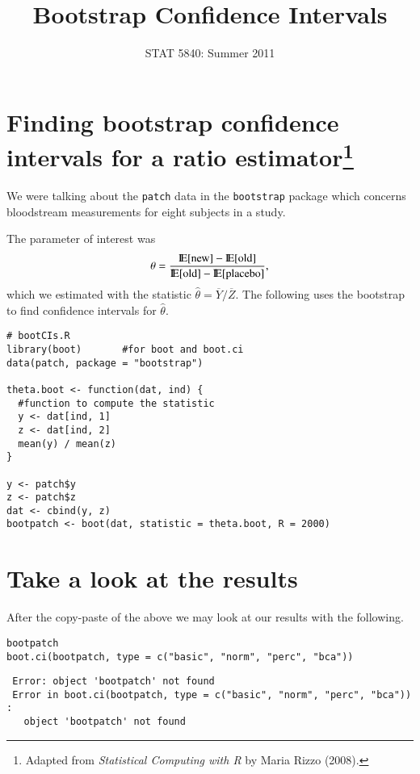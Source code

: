 \documentclass[11pt,english]{article}
\title{Bootstrap Confidence Intervals}
\date{STAT 5840: Summer 2011}
\begin{document}
\maketitle

\thispagestyle{empty}

\section*{Finding bootstrap confidence intervals for a ratio estimator\footnote{Adapted from \emph{Statistical Computing with R} by Maria Rizzo (2008). }}
\label{sec-1}

We were talking about the \texttt{patch} data in the \texttt{bootstrap} package which concerns bloodstream measurements for eight subjects in a study. 



The parameter of interest was
\[
\theta = \frac{\mathrm{I\hspace{-1.5pt}E}[\mathrm{new}] - \mathrm{I\hspace{-1.5pt}E}[\mathrm{old}]}{\mathrm{I\hspace{-1.5pt}E}[\mathrm{old}] - \mathrm{I\hspace{-1.5pt}E}[\mathrm{placebo}]},
\]
which we estimated with the statistic \(\hat{\theta} = \overline{Y}/\overline{Z}\).  The following uses the bootstrap to find confidence intervals for $\hat{\theta}$.


\begin{verbatim}
# bootCIs.R
library(boot)       #for boot and boot.ci
data(patch, package = "bootstrap")

theta.boot <- function(dat, ind) {
  #function to compute the statistic
  y <- dat[ind, 1]
  z <- dat[ind, 2]
  mean(y) / mean(z)
}

y <- patch$y
z <- patch$z
dat <- cbind(y, z)
bootpatch <- boot(dat, statistic = theta.boot, R = 2000)
\end{verbatim}
\section*{Take a look at the results}
\label{sec-2}

After the copy-paste of the above we may look at our results with the following.

\begin{verbatim}
bootpatch
boot.ci(bootpatch, type = c("basic", "norm", "perc", "bca"))
\end{verbatim}




\begin{verbatim}
 Error: object 'bootpatch' not found
 Error in boot.ci(bootpatch, type = c("basic", "norm", "perc", "bca")) : 
   object 'bootpatch' not found
\end{verbatim}
\end{document}
